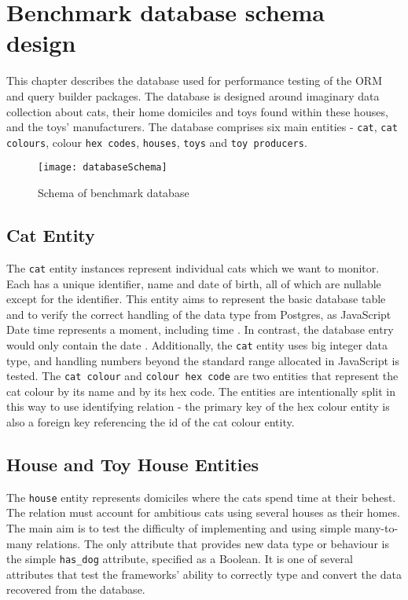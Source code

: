 \chapter{Benchmark database schema design}\label{ch:database}

This chapter describes the database used for performance testing of the ORM and
query builder packages. The database is designed around imaginary data
collection about cats, their home domiciles and toys found within these houses,
and the toys' manufacturers. The database comprises six main entities -
\texttt{cat}, \texttt{cat colours}, colour \texttt{hex codes}, \texttt{houses},
\texttt{toys} and \texttt{toy producers}.

\begin{figure}[b]
    \centering
    \texttt{[image: databaseSchema]}
    \caption{Schema of benchmark database}
\end{figure}

\section{Cat Entity}
The \texttt{cat} entity instances represent individual cats which we want to
monitor. Each has a unique identifier, name and date of birth, all of which are
nullable except for the identifier. This entity aims to represent the basic
database table and to verify the correct handling of the data type from
Postgres, as JavaScript Date time represents a moment, including time
\cite{JavaScript-Date-MDN}. In contrast, the database entry would only contain
the date \cite{Date/TimeTypes_Postgres}. Additionally, the \texttt{cat} entity
uses big integer data type, and handling numbers beyond the standard range
allocated in JavaScript is tested. The \texttt{cat colour} and \texttt{colour
hex code} are two entities that represent the cat colour by its name and by its
hex code. The entities are intentionally split in this way to use identifying
relation \cite{Karwin_2010} - the primary key of the hex colour entity is also a
foreign key referencing the id of the cat colour entity.

\section{House and Toy House Entities}
The \texttt{house} entity represents domiciles where the cats spend time at
their behest. The relation must account for ambitious cats using several houses
as their homes. The main aim is to test the difficulty of implementing and using
simple many-to-many relations. The only attribute that provides new data type or
behaviour is the simple \verb|has_dog| attribute, specified as a Boolean. It is
one of several attributes that test the frameworks' ability to correctly type
and convert the data recovered from the database.

